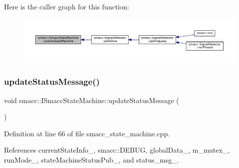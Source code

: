 Here is the caller graph for this function\+:
\nopagebreak
\begin{figure}[H]
\begin{center}
\leavevmode
\includegraphics[width=350pt]{classsmacc_1_1ISmaccStateMachine_ae2e3ceb87bfe3f9d8bf320e36071fdc7_icgraph}
\end{center}
\end{figure}
\mbox{\label{classsmacc_1_1ISmaccStateMachine_ad246a49015fadaeb0b1639d7ab99f7d0}} 
\subsubsection{\texorpdfstring{update\+Status\+Message()}{updateStatusMessage()}}
{\footnotesize\ttfamily void smacc\+::\+I\+Smacc\+State\+Machine\+::update\+Status\+Message (\begin{DoxyParamCaption}{ }\end{DoxyParamCaption})\hspace{0.3cm}{\ttfamily [private]}}



Definition at line 66 of file smacc\+\_\+state\+\_\+machine.\+cpp.



References current\+State\+Info\+\_\+, smacc\+::\+D\+E\+B\+UG, global\+Data\+\_\+, m\+\_\+mutex\+\_\+, run\+Mode\+\_\+, state\+Machine\+Status\+Pub\+\_\+, and status\+\_\+msg\+\_\+.


